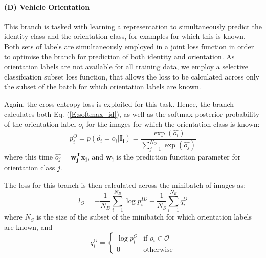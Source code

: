\documentclass[10pt,twocolumn,letterpaper]{article}
\begin{document}
\paragraph{(D) Vehicle Orientation}

This branch is tasked with learning a representation to simultaneously predict the identity class and the orientation class, for examples for which this is known.
Both sets of labels are simultaneously employed in a joint loss function in order to optimise the branch for prediction of both identity and orientation. As orientation labels are not available for all training data, we employ a selective classifcation subset loss function, that allows the loss to be calculated across only the subset of the batch for which orientation labels are known.

Again, the cross entropy loss is exploited for this task. Hence, the branch calculates both Eq. (\ref{E:softmax_id}), as well as the softmax posterior probability of the orientation label $o_i$ for the images for which the orientation class is known:
\begin{equation}
  p_i^{O} = p(\hat{o_i} = o_i|\mathbf{I_i}) = \frac{\exp(\hat{o_i})}{\sum_{j=1}^{N_{O}}\exp(\hat{o_j})}
\end{equation}
where this time $\hat{o_j} = \mathbf{w_j^Tx_j}$, and $\mathbf{w_j}$ is the prediction function parameter for orientation class $\emph{j}$.

The loss for this branch is then calculated across the minibatch of images as:
\begin{equation}
  l_{O} = -\frac{1}{N_B} \sum_{i=1}^{N_B}\log{p_i^{ID}} + \frac{1}{N_S} \sum_{i=1}^{N_B}q_i^O
\end{equation}
where $N_S$ is the size of the subset of the minibatch for which orientation labels are known, and
\[
q_i^O =
\begin{cases}
    \log{p_i^{O}} & \text{if } o_i \in \mathcal{O} \\
    0 & \text{otherwise}
\end{cases}
\]


\end{document}
